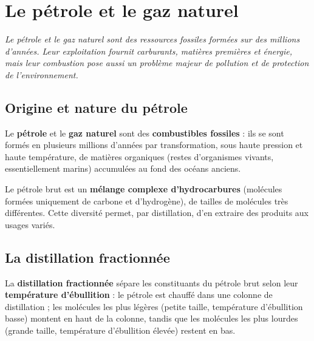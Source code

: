 \chapter{Le pétrole et le gaz naturel}

\noindent\textit{Le pétrole et le gaz naturel sont des ressources fossiles formées sur des
millions d'années. Leur exploitation fournit carburants, matières premières et énergie,
mais leur combustion pose aussi un problème majeur de pollution et de protection de
l'environnement.}
\vspace{8pt}

\connecteBanner

\section{Origine et nature du pétrole}

\begin{definition}
Le \textbf{pétrole} et le \textbf{gaz naturel} sont des \textbf{combustibles fossiles} :
ils se sont formés en plusieurs millions d'années par transformation, sous haute
pression et haute température, de matières organiques (restes d'organismes vivants,
essentiellement marins) accumulées au fond des océans anciens.
\end{definition}

\begin{propriete}
Le pétrole brut est un \textbf{mélange complexe d'hydrocarbures} (molécules formées
uniquement de carbone et d'hydrogène), de tailles de molécules très différentes. Cette
diversité permet, par distillation, d'en extraire des produits aux usages variés.
\end{propriete}

\section{La distillation fractionnée}

\begin{definition}
La \textbf{distillation fractionnée} sépare les constituants du pétrole brut selon leur
\textbf{température d'ébullition} : le pétrole est chauffé dans une colonne de
distillation ; les molécules les plus légères (petite taille, température d'ébullition
basse) montent en haut de la colonne, tandis que les molécules les plus lourdes (grande
taille, température d'ébullition élevée) restent en bas.
\end{definition}

